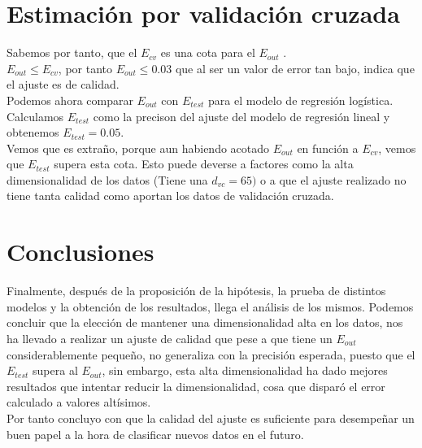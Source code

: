 \section{Estimación por validación cruzada}
Sabemos por tanto, que el $E_{cv}$ es una cota para el $E_{out}$ \cite{Cota}.\\
$E_{out} \leq E_{cv}$, por tanto $E_{out} \leq 0.03$ que al ser un valor de error tan bajo, indica que el ajuste es de calidad.\\
Podemos ahora comparar $E_{out}$ con $E_{test}$ para el modelo de regresión logística. Calculamos $E_{test}$ como la precison del ajuste del modelo de regresión lineal y obtenemos $E_{test}=0.05$.
\\
Vemos que es extraño, porque aun habiendo acotado $E_{out}$ en función a $E_{cv}$, vemos que $E_{test}$ supera esta cota. Esto puede deverse a factores como la alta dimensionalidad de los datos (Tiene una $d_{vc} = 65)$ o a que el ajuste realizado no tiene tanta calidad como aportan los datos de validación cruzada.

\section{Conclusiones}
Finalmente, después de la proposición de la hipótesis, la prueba de distintos modelos y la obtención de los resultados, llega el análisis de los mismos. Podemos concluir que la elección de mantener una dimensionalidad alta en los datos, nos ha llevado a realizar un ajuste de calidad que pese a que tiene un $E_{out}$ considerablemente pequeño, no generaliza con la precisión esperada, puesto que el $E_{test}$ supera al $E_{out}$, sin embargo, esta alta dimensionalidad ha dado mejores resultados que intentar reducir la dimensionalidad, cosa que disparó el error calculado a valores altísimos.\\
Por tanto concluyo con que la calidad del ajuste es suficiente para desempeñar un buen papel a la hora de clasificar nuevos datos en el futuro.
